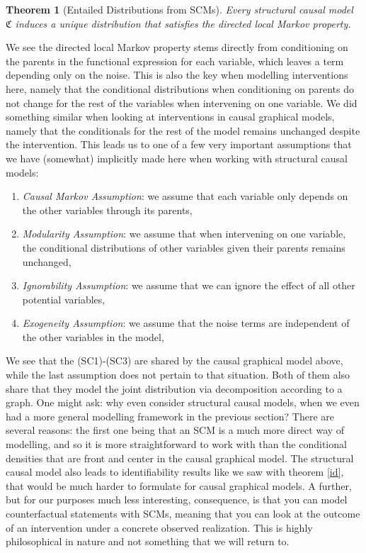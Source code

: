 \documentclass[11pt, a4paper]{memoir}
\theoremstyle{break}
\newtheorem{thm}{Theorem}
\theoremstyle{break}
\theoremstyle{nonumberplain}
\begin{document}
\begin{thm}[Entailed Distributions from SCMs]
Every structural causal model $\mathfrak{C}$ induces a unique distribution that satisfies the directed local Markov property.
\end{thm}
We see the directed local Markov property stems directly from conditioning on the parents in the functional expression for each variable, which leaves a term depending only on the noise. This is also the key when modelling interventions here, namely that the conditional distributions when conditioning on parents do not change for the rest of the variables when intervening on one variable. We did something similar when looking at interventions in causal graphical models, namely that the conditionals for the rest of the model remains unchanged despite the intervention. This leads us to one of a few very important assumptions that we have (somewhat) implicitly made here when working with structural causal models:
\begin{enumerate}[itemindent=15pt,label=(SC\arabic*)]
	\item \emph{Causal Markov Assumption}: we assume that each variable only depends on the other variables through its parents,
	\item \emph{Modularity Assumption}: we assume that when intervening on one variable, the conditional distributions of other variables given their parents remains unchanged,
	\item \emph{Ignorability Assumption}: we assume that we can ignore the effect of all other potential variables,
	\item \emph{Exogeneity Assumption}: we assume that the noise terms are independent of the other variables in the model,
\end{enumerate}
We see that the (SC1)-(SC3) are shared by the causal graphical model above, while the last assumption does not pertain to that situation. Both of them also share that they model the joint distribution via decomposition according to a graph. One might ask: why even consider structural causal models, when we even had a more general modelling framework in the previous section? There are several reasons: the first one being that an SCM is a much more direct way of modelling, and so it is more straightforward to work with than the conditional densities that are front and center in the causal graphical model. The structural causal model also leads to identifiability results like we saw with theorem \ref{id}, that would be much harder to formulate for causal graphical models. A further, but for our purposes much less interesting, consequence, is that you can model counterfactual statements with SCMs, meaning that you can look at the outcome of an intervention under a concrete observed realization. This is highly philosophical in nature and not something that we will return to.\\\\
\end{document}
